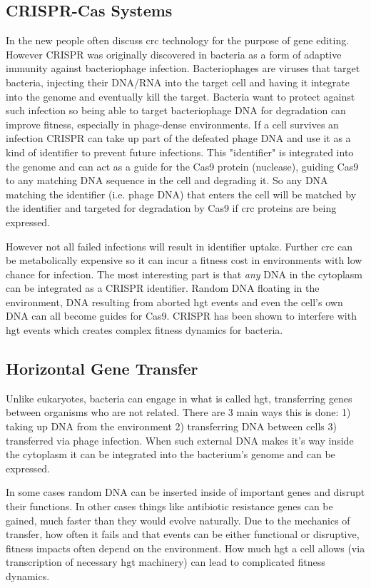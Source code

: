 \subsection{CRISPR-Cas Systems}
In the new people often discuss \ac{crc} technology for the purpose of gene editing.
However CRISPR was originally discovered in bacteria as a form of adaptive immunity against bacteriophage infection.
Bacteriophages are viruses that target bacteria, injecting their DNA/RNA into the target cell and having it integrate into the genome and eventually kill the target.
Bacteria want to protect against such infection so being able to target bacteriophage DNA for degradation can improve fitness, especially in phage-dense environments.
If a cell survives an infection CRISPR can take up part of the defeated phage DNA and use it as a kind of identifier to prevent future infections.
This "identifier" is integrated into the genome and can act as a guide for the Cas9 protein (nuclease), guiding Cas9 to any matching DNA sequence in the cell and degrading it.
So any DNA matching the identifier (i.e. phage DNA) that enters the cell will be matched by the identifier and targeted for degradation by Cas9 if \ac{crc} proteins are being expressed.

However not all failed infections will result in identifier uptake.
Further \ac{crc} can be metabolically expensive so it can incur a fitness cost in environments with low chance for infection.
The most interesting part is that \textit{any} DNA in the cytoplasm can be integrated as a CRISPR identifier.
Random DNA floating in the environment, DNA resulting from aborted \ac{hgt} events and even the cell's own DNA can all become guides for Cas9.
CRISPR has been shown to interfere with \ac{hgt} events which creates complex fitness dynamics for bacteria.

\subsection{Horizontal Gene Transfer}
Unlike eukaryotes, bacteria can engage in what is called \ac{hgt}, transferring genes between organisms who are not related.
There are 3 main ways this is done: 1) taking up DNA from the environment 2) transferring DNA between cells 3) transferred via phage infection.
When such external DNA makes it's way inside the cytoplasm it can be integrated into the bacterium's genome and can be expressed.

In some cases random DNA can be inserted inside of important genes and disrupt their functions.
In other cases things like antibiotic resistance genes can be gained, much faster than they would evolve naturally.
Due to the mechanics of transfer, how often it fails and that events can be either functional or disruptive, fitness impacts often depend on the environment.
How much \ac{hgt} a cell allows (via transcription of necessary \ac{hgt} machinery) can lead to complicated fitness dynamics.

